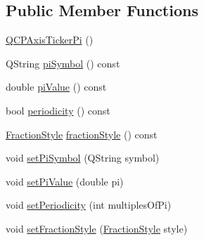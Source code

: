 \subsection*{Public Member Functions}
\begin{DoxyCompactItemize}
\item 
\mbox{\hyperlink{class_q_c_p_axis_ticker_pi_aa0d7b7034055927c0f0077a2d713d7d0}{Q\+C\+P\+Axis\+Ticker\+Pi}} ()
\item 
Q\+String \mbox{\hyperlink{class_q_c_p_axis_ticker_pi_a2fd785cd66a6f4f969ac2eca1b08e0f2}{pi\+Symbol}} () const
\item 
double \mbox{\hyperlink{class_q_c_p_axis_ticker_pi_abddc18799caa4ae6c721e1e5e229b3a4}{pi\+Value}} () const
\item 
bool \mbox{\hyperlink{class_q_c_p_axis_ticker_pi_aa320edf0a30386ce6a63c18050fbdfd8}{periodicity}} () const
\item 
\mbox{\hyperlink{class_q_c_p_axis_ticker_pi_a262f1534c7f0c79a7d5237f5d1e2c54c}{Fraction\+Style}} \mbox{\hyperlink{class_q_c_p_axis_ticker_pi_ab532d5e838168a8a5bbafea4eafc94be}{fraction\+Style}} () const
\item 
void \mbox{\hyperlink{class_q_c_p_axis_ticker_pi_acfdcd4758a393bde4be12a50fb2017b5}{set\+Pi\+Symbol}} (Q\+String symbol)
\item 
void \mbox{\hyperlink{class_q_c_p_axis_ticker_pi_a36ce0651d2ec92edd36feac1619c2468}{set\+Pi\+Value}} (double pi)
\item 
void \mbox{\hyperlink{class_q_c_p_axis_ticker_pi_a58f538dc01860fb56e46970e28a87f03}{set\+Periodicity}} (int multiples\+Of\+Pi)
\item 
void \mbox{\hyperlink{class_q_c_p_axis_ticker_pi_a760c8af6ca68178e607556c4e5049d71}{set\+Fraction\+Style}} (\mbox{\hyperlink{class_q_c_p_axis_ticker_pi_a262f1534c7f0c79a7d5237f5d1e2c54c}{Fraction\+Style}} style)
\end{DoxyCompactItemize}
